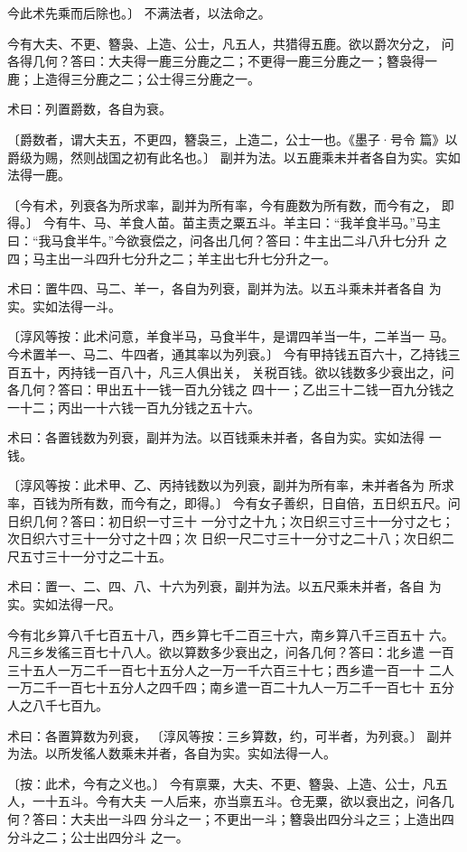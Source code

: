 \documentclass[a4paper,12pt,UTF8,twoside]{ctexbook}
\begin{document}
今此术先乘而后除也。〕 不满法者，以法命之。

今有大夫、不更、簪袅、上造、公士，凡五人，共猎得五鹿。欲以爵次分之， 问各得几何？答曰：大夫得一鹿三分鹿之二；不更得一鹿三分鹿之一；簪袅得一 鹿；上造得三分鹿之二；公士得三分鹿之一。

术曰：列置爵数，各自为衰。

〔爵数者，谓大夫五，不更四，簪袅三，上造二，公士一也。《墨子·号令 篇》以爵级为赐，然则战国之初有此名也。〕 副并为法。以五鹿乘未并者各自为实。实如法得一鹿。

〔今有术，列衰各为所求率，副并为所有率，今有鹿数为所有数，而今有之， 即得。〕 今有牛、马、羊食人苗。苗主责之粟五斗。羊主曰：“我羊食半马。”马主 曰：“我马食半牛。”今欲衰偿之，问各出几何？答曰：牛主出二斗八升七分升 之四；马主出一斗四升七分升之二；羊主出七升七分升之一。

术曰：置牛四、马二、羊一，各自为列衰，副并为法。以五斗乘未并者各自 为实。实如法得一斗。

〔淳风等按：此术问意，羊食半马，马食半牛，是谓四羊当一牛，二羊当一 马。今术置羊一、马二、牛四者，通其率以为列衰。〕 今有甲持钱五百六十，乙持钱三百五十，丙持钱一百八十，凡三人俱出关， 关税百钱。欲以钱数多少衰出之，问各几何？答曰：甲出五十一钱一百九分钱之 四十一；乙出三十二钱一百九分钱之一十二；丙出一十六钱一百九分钱之五十六。

术曰：各置钱数为列衰，副并为法。以百钱乘未并者，各自为实。实如法得 一钱。

〔淳风等按：此术甲、乙、丙持钱数以为列衰，副并为所有率，未并者各为 所求率，百钱为所有数，而今有之，即得。〕 今有女子善织，日自倍，五日织五尺。问日织几何？答曰：初日织一寸三十 一分寸之十九；次日织三寸三十一分寸之七；次日织六寸三十一分寸之十四；次 日织一尺二寸三十一分寸之二十八；次日织二尺五寸三十一分寸之二十五。

术曰：置一、二、四、八、十六为列衰，副并为法。以五尺乘未并者，各自 为实。实如法得一尺。

今有北乡算八千七百五十八，西乡算七千二百三十六，南乡算八千三百五十 六。凡三乡发徭三百七十八人。欲以算数多少衰出之，问各几何？答曰：北乡遣 一百三十五人一万二千一百七十五分人之一万一千六百三十七；西乡遣一百一十 二人一万二千一百七十五分人之四千四；南乡遣一百二十九人一万二千一百七十 五分人之八千七百九。

术曰：各置算数为列衰， 〔淳风等按：三乡算数，约，可半者，为列衰。〕 副并为法。以所发徭人数乘未并者，各自为实。实如法得一人。

〔按：此术，今有之义也。〕 今有禀粟，大夫、不更、簪袅、上造、公士，凡五人，一十五斗。今有大夫 一人后来，亦当禀五斗。仓无粟，欲以衰出之，问各几何？答曰：大夫出一斗四 分斗之一；不更出一斗；簪袅出四分斗之三；上造出四分斗之二；公士出四分斗 之一。
\end{document}
